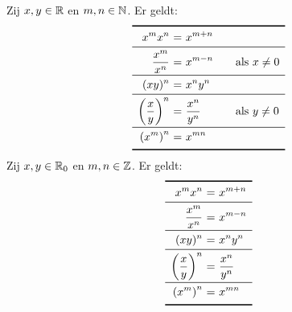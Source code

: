 \documentclass{ximera}
\begin{document}
\begin{proposition}
	Zij $x,y\in\mathbb{R}$ en $m,n\in\mathbb{N}$. Er geldt:
	\[
	\begin{array}{r@{\ =\ }l@{\qquad}l}
	\specialrule{.1em}{0ex}{1ex}
	\ds{x^{m}x^{n}}&\ds{x^{m+n}}&\\
	\midrule
	\ds{\frac{x^{m}}{x^{n}}}&\ds{x^{m-n}}&\textrm{als }x\neq0\\
	\midrule
	\ds{(xy)^n}&\ds{x^ny^n}&\\
	\midrule
	\ds{\left(\frac{x}{y}\right)^{n}}&\ds{\frac{x^{n}}{y^{n}}}&\textrm{als }y\neq0\\
	\midrule
	\ds{\left(x^{m}\right)^{n}}&\ds{x^{mn}}&\\
	\specialrule{.1em}{1ex}{0ex}
	\end{array}
	\]
	Zij $x,y\in\mathbb{R}_0$ en $m,n\in\mathbb{Z}$. Er geldt:
	\[
	\begin{array}{r@{\ =\ }l}
	\specialrule{.1em}{0ex}{1ex}
	\ds{x^{m}x^{n}}&\ds{x^{m+n}}\\
	\midrule
	\ds{\frac{x^{m}}{x^{n}}}&\ds{x^{m-n}}\\
	\midrule
	\ds{(xy)^n}&\ds{x^ny^n}\\
	\midrule
	\ds{\left(\frac{x}{y}\right)^{n}}&\ds{\frac{x^{n}}{y^{n}}}\\
	\midrule
	\ds{\left(x^{m}\right)^{n}}&\ds{x^{mn}}\\
	\specialrule{.1em}{1ex}{0ex}
	\end{array}
	\]
\end{proposition}


\newpage
\end{document}
